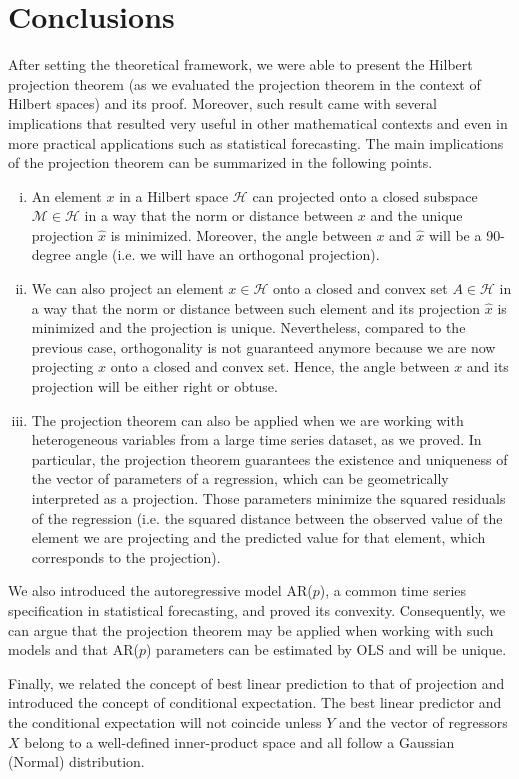 \documentclass{article}
\begin{document}
\newpage

\section{Conclusions}
After setting the theoretical framework, we were able to present the Hilbert projection theorem (as we evaluated the projection theorem in the context of Hilbert spaces) and its proof. Moreover, such result came with several implications that resulted very useful in other mathematical contexts and even in more practical applications such as statistical forecasting. The main implications of the projection theorem can be summarized in the following points.
\begin{enumerate}[(i)]
\item An element $x$ in a Hilbert space $\mathscr{H}$ can projected onto a closed subspace $\mathscr{M} \in \mathscr{H}$ in a way that the norm or distance between $x$ and the unique projection $\hat{x}$ is minimized. Moreover, the angle between $x$ and $\hat{x}$ will be a 90-degree angle (i.e. we will have an orthogonal projection).
\item We can also project an element $x \in \mathscr{H}$ onto a closed and convex set $A \in \mathscr{H}$ in a way that the norm or distance between such element and its projection $\hat{x}$ is minimized and the projection is unique. Nevertheless, compared to the previous case, orthogonality is not guaranteed anymore because we are now projecting $x$ onto a closed and convex set. Hence, the angle between $x$ and its projection will be either right or obtuse.
\item The projection theorem can also be applied when we are working with heterogeneous variables from a large time series dataset, as we proved. In particular, the projection theorem guarantees the existence and uniqueness of the vector of parameters of a regression, which can be geometrically interpreted as a projection. Those parameters minimize the squared residuals of the regression (i.e. the squared distance between the observed value of the element we are projecting and the predicted value for that element, which corresponds to the projection). 
\end{enumerate}

We also introduced the autoregressive model AR($p$), a common time series specification in statistical forecasting, and proved its convexity. Consequently, we can argue that the projection theorem may be applied when working with such models and that AR($p$) parameters can be estimated by OLS and will be unique. \newline

Finally, we related the concept of best linear prediction to that of projection and introduced the concept of conditional expectation. The best linear predictor and the conditional expectation will not coincide unless $Y$ and the vector of regressors $X$ belong to a well-defined inner-product space and all follow a Gaussian (Normal) distribution.

\newpage


  

\nocite{Hamilton:1994}
\nocite{PeressiniSullivanUhl:1991}
\nocite{Skiadas:2009}
\nocite{DomokosIngramMarsh:2016}
\nocite{Bosq:2014}
\end{document}
